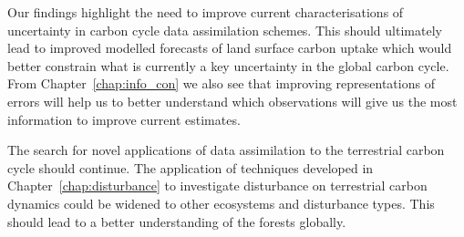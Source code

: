Our findings highlight the need to improve current characterisations of uncertainty in carbon cycle data assimilation schemes. This should ultimately lead to improved modelled forecasts of land surface carbon uptake which would better constrain what is currently a key uncertainty in the global carbon cycle. From Chapter~\ref{chap:info_con} we also see that improving representations of errors will help us to better understand which observations will give us the most information to improve current estimates. 

The search for novel applications of data assimilation to the terrestrial carbon cycle should continue. The application of techniques developed in Chapter~\ref{chap:disturbance} to investigate disturbance on terrestrial carbon dynamics could be widened to other ecosystems and disturbance types. This should lead to a better understanding of the forests globally. 
